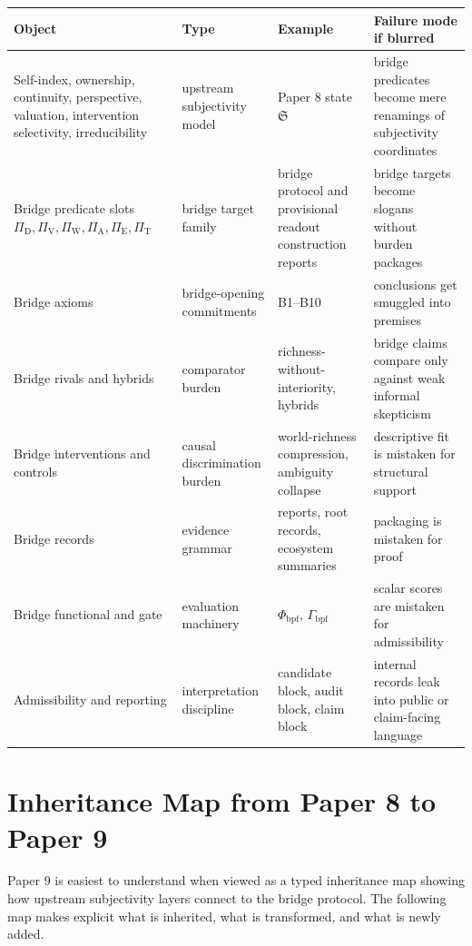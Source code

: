 \documentclass[11pt,a4paper]{article}
\theoremstyle{definition}
\newcommand{\Substate}{\mathfrak{S}}
\newcommand{\PiD}{\Pi_{\mathrm{D}}}
\newcommand{\PiV}{\Pi_{\mathrm{V}}}
\newcommand{\PiW}{\Pi_{\mathrm{W}}}
\newcommand{\PiA}{\Pi_{\mathrm{A}}}
\newcommand{\PiE}{\Pi_{\mathrm{E}}}
\newcommand{\PiT}{\Pi_{\mathrm{T}}}
\newcommand{\PhiBridge}{\Phi_{\mathrm{bpf}}}
\newcommand{\GateBridge}{\Gamma_{\mathrm{bpf}}}
\begin{document}
\begin{center}
\small
\begin{tabularx}{\linewidth}{@{}>{\raggedright\arraybackslash}p{}>{\raggedright\arraybackslash}p{}>{\raggedright\arraybackslash}p{}>{\raggedright\arraybackslash}p{}@{}}
\toprule
Object & Type & Example & Failure mode if blurred \\
\midrule
Self-index, ownership, continuity, perspective, valuation, intervention selectivity, irreducibility & upstream subjectivity model & Paper 8 state $\Substate$ & bridge predicates become mere renamings of subjectivity coordinates \\
Bridge predicate slots $\PiD,\allowbreak \PiV,\allowbreak \PiW,\allowbreak \PiA,\allowbreak \PiE,\allowbreak \PiT$ & bridge target family & bridge protocol and provisional readout construction reports & bridge targets become slogans without burden packages \\
Bridge axioms & bridge-opening commitments & B1--B10 & conclusions get smuggled into premises \\
Bridge rivals and hybrids & comparator burden & richness-without-interiority, hybrids & bridge claims compare only against weak informal skepticism \\
Bridge interventions and controls & causal discrimination burden & world-richness compression, ambiguity collapse & descriptive fit is mistaken for structural support \\
Bridge records & evidence grammar & reports, root records, ecosystem summaries & packaging is mistaken for proof \\
Bridge functional and gate & evaluation machinery & $\PhiBridge$, $\GateBridge$ & scalar scores are mistaken for admissibility \\
Admissibility and reporting & interpretation discipline & candidate block, audit block, claim block & internal records leak into public or claim-facing language \\
\bottomrule
\end{tabularx}
\end{center}

\section{Inheritance Map from Paper 8 to Paper 9}
Paper 9 is easiest to understand when viewed as a typed inheritance map showing how upstream subjectivity layers connect to the bridge protocol. The following map makes explicit what is inherited, what is transformed, and what is newly added.
\end{document}
